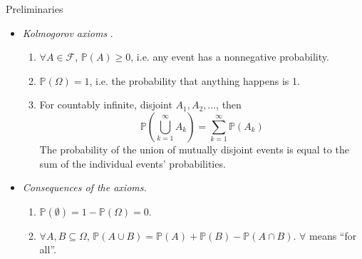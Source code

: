 \documentclass{beamer}
\begin{document}
\begin{frame}{Preliminaries}
    \begin{itemize}
        \item
        \textit{Kolmogorov axioms} \cite{all_of_stats}.
        \begin{enumerate}
            \item
            $ \forall A \in \mathcal{F} $, $ \mathbb{P}(A) \ge 0 $, i.e. any
            event has a nonnegative probability.

            \item
            $ \mathbb{P}(\Omega) = 1 $, i.e. the probability that anything
            happens is 1.

            \item
            For countably infinite, disjoint $ A_1, A_2, \ldots $, then
            \begin{equation*}
                \mathbb{P}\left(\bigcup_{k = 1}^\infty A_k\right) =
                \sum_{k = 1}^\infty\mathbb{P}(A_k)
            \end{equation*}
            The probability of the union of mutually disjoint events is equal
            to the sum of the individual events' probabilities.
        \end{enumerate}

        \item
        \textit{Consequences of the axioms.}
        \begin{enumerate}
            \item
            $ \mathbb{P}(\emptyset) = 1 - \mathbb{P}(\Omega) = 0 $.

            \item
            $ \forall A, B \subseteq \Omega $, $ \mathbb{P}(A \cup B) =
            \mathbb{P}(A) + \mathbb{P}(B) - \mathbb{P}(A \cap B) $. $ \forall $
            means ``for all''.
        \end{enumerate}
    \end{itemize}
\end{frame}
\end{document}
